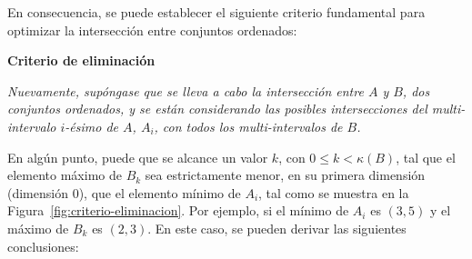 En consecuencia, se puede establecer el siguiente criterio fundamental para optimizar la intersección entre conjuntos ordenados:

\begin{center}
\end{center}

{\bf Criterio de eliminación}

\begin{center}
    \textit{Nuevamente, supóngase que se lleva a cabo la intersección entre $A$ y $B$, dos conjuntos ordenados, y se están considerando las posibles intersecciones del multi-intervalo \( i \)-ésimo de $A$, \( A_i \), con todos los multi-intervalos de $B$.}
\end{center}

En algún punto, puede que se alcance un valor $k$, con $0 \leq k < \kappa(B)$, tal que el elemento máximo de $B_k$ sea estrictamente menor, en su primera dimensión (dimensión $0$), que el elemento mínimo de $A_i$, tal como se muestra en la Figura~\ref{fig:criterio-eliminacion}. Por ejemplo, si el mínimo de $A_i$ es $(3,5)$ y el máximo de $B_k$ es  $(2,3)$. En este caso, se pueden derivar las siguientes conclusiones:

